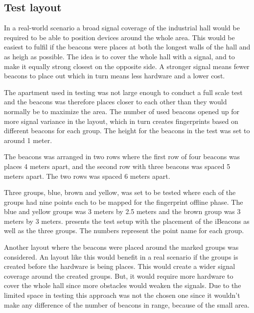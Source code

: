 


\subsection{Test layout}\label{sec:methodTestLayout}
In a real-world scenario a broad signal coverage of the industrial hall would be required to be able to position devices around the whole area.
This would be easiest to fulfil if the beacons were places at both the longest walls of the hall and as heigh as possible.
The idea is to cover the whole hall with a signal, and to make it equally strong closest on the opposite side.
A stronger signal means fewer beacons to place out which in turn means less hardware and a lower cost.

\bigskip

The apartment used in testing was not large enough to conduct a full scale test and the beacons was therefore places closer to each other than they would normally be to maximize the area.
The number of used beacons opened up for more signal variance in the layout, which in turn creates fingerprints based on different beacons for each group.
The height for the beacons in the test was set to around 1 meter.

\bigskip

The beacons was arranged in two rows where the first row of four beacons was places 4 meters apart, and the second row with three beacons was spaced 5 meters apart.
The two rows was spaced 6 meters apart.

\bigskip


Three groups, blue, brown and yellow, was set to be tested where each of the groups had nine points each to be mapped for the fingerprint offline phase.
The blue and yellow groups was 3 meters by 2.5 meters and the brown group was 3 meters by 3 meters.
 presents the test setup with the placement of the iBeacons as well as the three groups.
The numbers represent the point name for each group.


Another layout where the beacons were placed around the marked groups was considered.
An layout like this would benefit in a real scenario if the groups is created before the hardware is being places.
This would create a wider signal coverage around the created groups.
But, it would require more hardware to cover the whole hall since more obstacles would weaken the signals.
Due to the limited space in testing this approach was not the chosen one since it wouldn't make any difference of the number of beacons in range, because of the small area.

